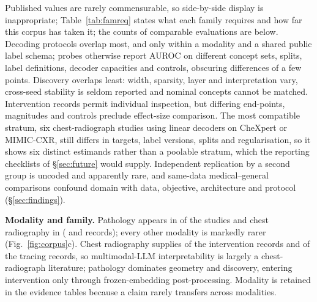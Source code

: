 Published values are rarely commensurable, so side-by-side display is inappropriate;
Table~\ref{tab:famreq} states what each family requires and how far this corpus has taken it; the counts of comparable evaluations are below. Decoding protocols
overlap most, and only within a modality and a shared public label schema; probes otherwise report AUROC
on different concept sets, splits, label definitions, decoder capacities and controls, obscuring
differences of a few points. Discovery overlaps least: width, sparsity, layer and
interpretation vary, cross-seed stability is seldom reported and nominal concepts cannot be matched.
Intervention records permit individual inspection, but differing end-points, magnitudes and controls preclude
effect-size comparison. The most compatible stratum, six chest-radiograph studies using linear decoders on CheXpert or MIMIC-CXR, still differs in targets, label versions, splits and
regularisation, so it shows six distinct estimands rather than a poolable stratum, which the reporting
checklists of \S\ref{sec:future} would supply. Independent replication by a second group is uncoded and
apparently rare, and same-data medical--general comparisons confound domain with data, objective,
architecture and protocol (\S\ref{sec:findings}).

\textbf{Modality and family.} Pathology appears in \Npathstud{} of the \Ncore{} studies and chest radiography in
\Ncxrstud{} (\Npathrec{} and \Ncxrrec{} records); every other modality is markedly rarer
(Fig.~\ref{fig:corpus}c). Chest radiography supplies \Nintcxr{} of the \Nintrec{} intervention records and
\Ntracecxr{} of the \Ntracerec{} tracing records, so multimodal-LLM interpretability is largely a
chest-radiograph literature; pathology dominates geometry and discovery, entering intervention only through
frozen-embedding post-processing. Modality is retained in the evidence tables because a claim rarely
transfers across modalities.

